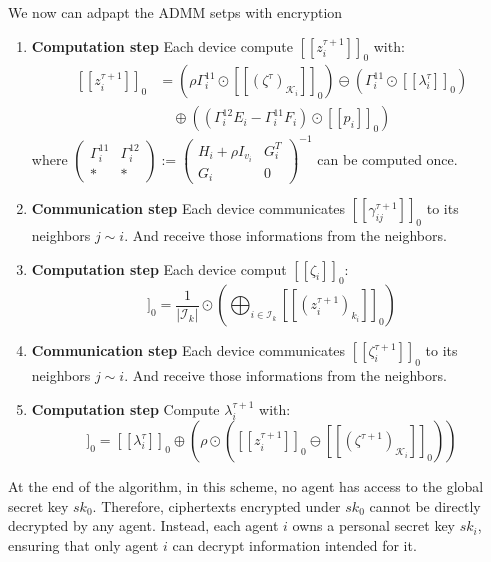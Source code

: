 \documentclass[10pt,english]{article}
\begin{document}
We now can adpapt the ADMM setps with encryption
\begin{enumerate} \label{ADMM explicit}
    \item  \textbf{Computation step} Each device compute $[\![z_i^{\tau+1}]\!]_0 $ with:
\begin{equation*}
\begin{aligned}
[\![z_i^{\tau+1}]\!]_0 &= \left( \rho \Gamma_i^{11} \odot [\![(\zeta^\tau)_{\mathcal{K}_i}]\!]_0 \right) \ominus \left( \Gamma_i^{11} \odot [\![\lambda_i^\tau]\!]_0 \right) \\
&\quad \oplus \left( (\Gamma_i^{12} E_i - \Gamma_i^{11} F_i) \odot [\![p_i]\!]_0 \right)
\end{aligned}
\end{equation*}
where 
$
\begin{pmatrix} \Gamma_i^{11} & \Gamma_i^{12} \\ * & * \end{pmatrix} := \begin{pmatrix} H_i + \rho I_{v_i} & G_i^T \\ G_i & 0 \end{pmatrix}^{-1}
$
can be computed once. 
    \item \textbf{Communication step} Each device communicates $[\![\gamma_{ij}^{\tau  +1}]\!]_0$ to its neighbors $j\sim i$. And receive those informations from the neighbors.
    \item \textbf{Computation step}
    Each device comput $[\![\zeta_i]\!]_0$: 
\begin{equation}
    [\![\zeta^{\tau+1}]\!]_0 = \frac{1}{|\mathcal{I}_k|} \odot \left( \bigoplus_{i \in \mathcal{I}_k} [\![(z_i^{\tau+1})_{k_i}]\!]_0 \right)
\end{equation}
    \item \textbf{Communication step}
    Each device communicates $[\![\zeta_{i}^{\tau+1}]\!]_0$ to its neighbors $j\sim i$. And receive those informations from the neighbors.
    \item \textbf{Computation step} Compute $\lambda_i^{\tau+1}$ with:
\begin{equation}
    [\![\lambda_i^{\tau+1}]\!]_0 = [\![\lambda_i^\tau]\!]_0 \oplus \left( \rho \odot \left( [\![z_i^{\tau+1}]\!]_0 \ominus [\![(\zeta^{\tau+1})_{\mathcal{K}_i}]\!]_0 \right) \right)
\end{equation}
\end{enumerate}

At the end of the algorithm, in this scheme, no agent has access to the global secret key $sk_0$. 
Therefore, ciphertexts encrypted under $sk_0$ cannot be directly decrypted by any agent. 
Instead, each agent $i$ owns a personal secret key $sk_i$, ensuring that only agent $i$ can decrypt information intended for it.
\end{document}

